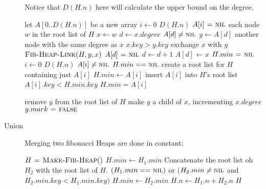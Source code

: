 \begin{description}
  Notice that $D(H.n)$ here will calculate the upper bound on the degree.
  \begin{codebox}
    \li let $A[0..D(H.n)] $ be a new array
    \li \For $i \gets 0$ \To $D(H.n)$ \Do
    \li   $A[i] \mathrel{\hspace{1pt}=\hspace{1pt}} \textnormal{\scshape nil}$ \End
    \li \For each node $w$ in the root list of $H$ \Do
    \li   $x \gets w$
    \li   $d \gets x.degree$
    \li   \While $A[d] \neq \textnormal{\scshape nil}$ \Do
    \li     $y \gets A[d]$ \Comment another node with the same degree as $x$
    \li     \If $x.key > y.key$ \Do
    \li       exchange $x$ with $y$ \End
    \li     $\textnormal{\scshape Fib-Heap-Link}(H,y,x)$
    \li     $A[d] \mathrel{\hspace{1pt}=\hspace{1pt}} \textnormal{\scshape nil}$
    \li     $d \gets d + 1$ \End
    \li   $A[d] \gets x$ \End
    \li $H.min \mathrel{\hspace{1pt}=\hspace{1pt}} \textnormal{\scshape nil}$
    \li \For $i \gets 0$ \To $D(H.n)$ \Do
    \li   \If $A[i] \neq \textnormal{\scshape nil}$ \Do
    \li     \If $H.min == \textnormal{\scshape nil}$ \Do
    \li       create a root list for $H$ containing just $A[i]$
    \li       $H.min \gets A[i]$
    \li     \Else insert $A[i]$ into $H$'s root list \Do
    \li       \If $A[i].key < H.min.key$ \Do
    \li         $H.min = A[i]$
  \end{codebox}

  \begin{codebox}
    \li remove $y$ from the root list of $H$
    \li make $y$ a child of $x$, incrementing $x.degree$
    \li $y.mark \mathrel{\hspace{1pt}=\hspace{1pt}} \textnormal{\scshape false}$
  \end{codebox}


\item[Union] Merging two fibonacci Heaps are done in constant:
  \begin{codebox}
    \li $H \mathrel{\hspace{1pt}=\hspace{1pt}} \textnormal{\scshape Make-Fib-Heap}()$
    \li $H.min \gets H_1.min$
    \li Concatenate the root list oh $H_2$ with the root list of $H$.
    \li \If $(H_1.min == \textnormal{\scshape nil})$ or ($H_2.min \neq \textnormal{\scshape nil}$ and $H_2.min.key < H_1.min.key)$ \Do
    \li   $H.min \gets H_2.min$ \End
    \li $H.n \gets H_1.n + H_2.n$
    \li \Return $H$
  \end{codebox}


\end{description}
